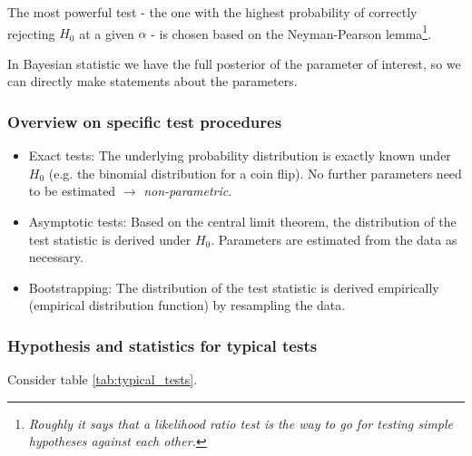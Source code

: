 The most powerful test - the one with the highest probability of correctly rejecting $H_0$ at a given $\alpha$ - is chosen based on the Neyman-Pearson lemma\footnote{\textit{Roughly it says that a likelihood ratio test is the way to go for testing simple hypotheses against each other.}}.

In Bayesian statistic we have the full posterior of the parameter of interest, so we can
directly make statements about the parameters.

\subsubsection{Overview on specific test procedures}
\begin{itemize}
    \item \textcolor{blue1}{Exact tests}: The underlying probability distribution is exactly known under $H_0$ (e.g. the binomial distribution for a coin flip). No further parameters need to be estimated $\rightarrow$ \textit{non-parametric}.
    \item \textcolor{blue1}{Asymptotic tests}: Based on the central limit theorem, the distribution of the test statistic is derived under $H_0$. Parameters are estimated from the data as necessary.
    \item \textcolor{blue1}{Bootstrapping}: The distribution of the test statistic is derived empirically (empirical distribution function) by resampling the data.
\end{itemize}

\subsubsection{Hypothesis and statistics for typical tests}
Consider table \ref{tab:typical_tests}.

